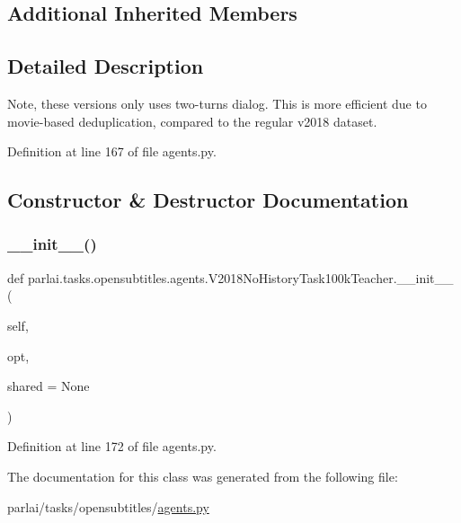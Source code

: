 \subsection*{Additional Inherited Members}


\subsection{Detailed Description}
\begin{DoxyVerb}Note, these versions only uses two-turns dialog. This is more efficient
due to movie-based deduplication, compared to the regular v2018 dataset.
\end{DoxyVerb}
 

Definition at line 167 of file agents.\+py.



\subsection{Constructor \& Destructor Documentation}
\mbox{\label{classparlai_1_1tasks_1_1opensubtitles_1_1agents_1_1V2018NoHistoryTask100kTeacher_ac0ca125ef0f17779db17f4ad044294e6}} 
\subsubsection{\texorpdfstring{\+\_\+\+\_\+init\+\_\+\+\_\+()}{\_\_init\_\_()}}
{\footnotesize\ttfamily def parlai.\+tasks.\+opensubtitles.\+agents.\+V2018\+No\+History\+Task100k\+Teacher.\+\_\+\+\_\+init\+\_\+\+\_\+ (\begin{DoxyParamCaption}\item[{}]{self,  }\item[{}]{opt,  }\item[{}]{shared = {\ttfamily None} }\end{DoxyParamCaption})}



Definition at line 172 of file agents.\+py.



The documentation for this class was generated from the following file\+:\begin{DoxyCompactItemize}
\item 
parlai/tasks/opensubtitles/\hyperlink{parlai_2tasks_2opensubtitles_2agents_8py}{agents.\+py}\end{DoxyCompactItemize}
